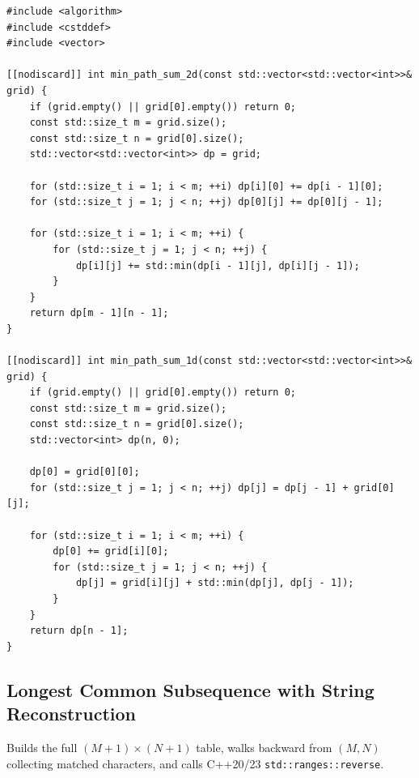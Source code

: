 \documentclass[11pt,a4paper]{article}
\theoremstyle{definition}
\begin{document}
\begin{lstlisting}[caption={Grid Minimum Path Sum in 2D and rolling 1D space}]
#include <algorithm>
#include <cstddef>
#include <vector>

[[nodiscard]] int min_path_sum_2d(const std::vector<std::vector<int>>& grid) {
    if (grid.empty() || grid[0].empty()) return 0;
    const std::size_t m = grid.size();
    const std::size_t n = grid[0].size();
    std::vector<std::vector<int>> dp = grid;

    for (std::size_t i = 1; i < m; ++i) dp[i][0] += dp[i - 1][0];
    for (std::size_t j = 1; j < n; ++j) dp[0][j] += dp[0][j - 1];

    for (std::size_t i = 1; i < m; ++i) {
        for (std::size_t j = 1; j < n; ++j) {
            dp[i][j] += std::min(dp[i - 1][j], dp[i][j - 1]);
        }
    }
    return dp[m - 1][n - 1];
}

[[nodiscard]] int min_path_sum_1d(const std::vector<std::vector<int>>& grid) {
    if (grid.empty() || grid[0].empty()) return 0;
    const std::size_t m = grid.size();
    const std::size_t n = grid[0].size();
    std::vector<int> dp(n, 0);

    dp[0] = grid[0][0];
    for (std::size_t j = 1; j < n; ++j) dp[j] = dp[j - 1] + grid[0][j];

    for (std::size_t i = 1; i < m; ++i) {
        dp[0] += grid[i][0];
        for (std::size_t j = 1; j < n; ++j) {
            dp[j] = grid[i][j] + std::min(dp[j], dp[j - 1]);
        }
    }
    return dp[n - 1];
}
\end{lstlisting}

\subsection{Longest Common Subsequence with String Reconstruction}
Builds the full $(M + 1) \times (N + 1)$ table, walks backward from $(M, N)$ collecting matched characters, and calls C++20/23 \texttt{std::ranges::reverse}.
\end{document}
